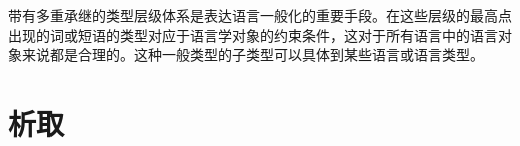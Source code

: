 带有多重承继的类型层级体系是表达语言一般化的重要手段。在这些层级的最高点出现的词或短语的类型对应于语言学对象的约束条件，这对于所有语言中的语言对象来说都是合理的。这种一般类型的子类型可以具体到某些语言或语言类型。

\section{析取}

